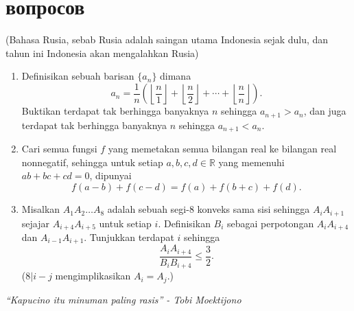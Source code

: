 \documentclass{article}
\begin{document}
	\section{вопросов}
	(Bahasa Rusia, sebab Rusia adalah saingan utama Indonesia sejak dulu, dan tahun ini Indonesia akan mengalahkan Rusia)
	\vspace{1em}
	\begin{enumerate}
		\item Definisikan sebuah barisan $\{ a_n \}$ dimana \[ a_n = \frac{1}{n} \left( \left\lfloor \frac{n}{1} \right\rfloor + \left\lfloor \frac{n}{2} \right\rfloor + \dotsb + \left\lfloor \frac{n}{n} \right\rfloor \right). \] Buktikan terdapat tak berhingga banyaknya $n$ sehingga $a_{n + 1} > a_n$, dan juga terdapat tak berhingga banyaknya $n$ sehingga $a_{n + 1} < a_n$.
		\item Cari semua fungsi $f$ yang memetakan semua bilangan real ke bilangan real nonnegatif, sehingga untuk setiap $a, b, c, d \in \mathbb{R}$ yang memenuhi $ab + bc + cd = 0$, dipunyai \[ f(a - b) + f(c - d) = f(a) + f(b + c) + f(d).\]
		\item Misalkan $A_1A_2\dotso A_8$ adalah sebuah segi-8 konveks sama sisi sehingga $A_iA_{i+1}$ sejajar $A_{i+4}A_{i+5}$ untuk setiap $i$. Definisikan $B_i$ sebagai perpotongan $A_iA_{i+4}$ dan $A_{i-1}A_{i+1}$. Tunjukkan terdapat $i$ sehingga \[\frac{A_iA_{i+4}}{B_iB_{i+4}} \le \frac{3}{2}.\] ($8 | i - j$ mengimplikasikan $A_i = A_j$.)
	\end{enumerate}
	\begin{center}
		\textit{``Kapucino itu minuman paling rasis'' - Tobi Moektijono}
	\end{center}
\end{document}
